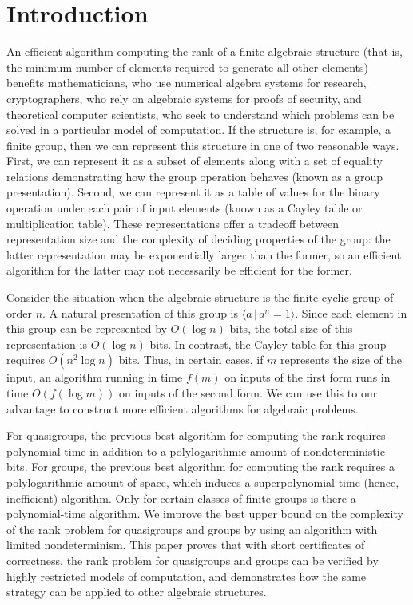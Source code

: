 \section{Introduction}
%
An efficient algorithm computing the rank of a finite algebraic structure (that is, the minimum number of elements required to generate all other elements) benefits mathematicians, who use numerical algebra systems for research, cryptographers, who rely on algebraic systems for proofs of security, and theoretical computer scientists, who seek to understand which problems can be solved in a particular model of computation.
If the structure is, for example, a finite group, then we can represent this structure in one of two reasonable ways.
First, we can represent it as a subset of elements along with a set of equality relations demonstrating how the group operation behaves (known as a group presentation).
Second, we can represent it as a table of values for the binary operation under each pair of input elements (known as a Cayley table or multiplication table).
These representations offer a tradeoff between representation size and the complexity of deciding properties of the group: the latter representation may be exponentially larger than the former, so an efficient algorithm for the latter may not necessarily be efficient for the former.

Consider the situation when the algebraic structure is the finite cyclic group of order $n$.
A natural presentation of this group is $\langle a \, | \, a^n = 1 \rangle$.
Since each element in this group can be represented by $O(\log n)$ bits, the total size of this representation is $O(\log n)$ bits.
In contrast, the Cayley table for this group requires $O(n^2 \log n)$ bits.
Thus, in certain cases, if $m$ represents the size of the input, an algorithm running in time $f(m)$ on inputs of the first form runs in time $O(f(\log m))$ on inputs of the second form.
We can use this to our advantage to construct more efficient algorithms for algebraic problems.

%
For quasigroups, the previous best algorithm for computing the rank requires polynomial time in addition to a polylogarithmic amount of nondeterministic bits.
For groups, the previous best algorithm for computing the rank requires a polylogarithmic amount of space, which induces a superpolynomial-time (hence, inefficient) algorithm.
Only for certain classes of finite groups is there a polynomial-time algorithm.
We improve the best upper bound on the complexity of the rank problem for quasigroups and groups by using an algorithm with limited nondeterminism.
This paper proves that with short certificates of correctness, the rank problem for quasigroups and groups can be verified by highly restricted models of computation, and demonstrates how the same strategy can be applied to other algebraic structures.

